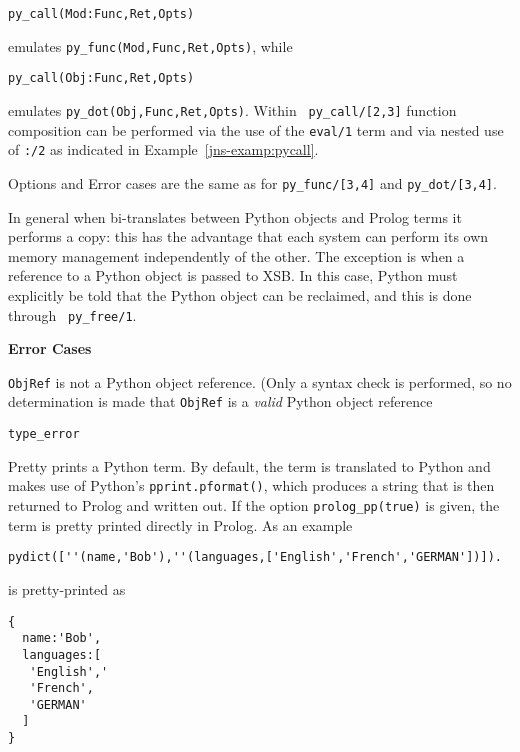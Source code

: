 \begin{description}
{\tt py\_call(Mod:Func,Ret,Opts)}

\noindent
emulates {\tt py\_func(Mod,Func,Ret,Opts)}, while

{\tt py\_call(Obj:Func,Ret,Opts)}

\noindent
emulates {\tt py\_dot(Obj,Func,Ret,Opts)}.  Within {\tt
  py\_call/[2,3]} function composition can be performed via the use of
the {\tt eval/1} term and via nested use of {\tt :/2} as indicated in
Example~\ref{jns-examp:pycall}.

Options and Error cases
are the same as for {\tt py\_func/[3,4]} and {\tt py\_dot/[3,4]}.

%
  In general when \janus{} bi-translates between Python objects and
  Prolog terms it performs a copy: this has the advantage that each
  system can perform its own memory management independently of the
  other.  The exception is when a reference to a Python object is
  passed to XSB.  In this case, Python must explicitly be told that
  the Python object can be reclaimed, and this is done through {\tt
    py\_free/1}.

  {\bf Error Cases}

  \bi
\item {\tt ObjRef} is not a Python object reference.  (Only a syntax
  check is performed, so no determination is made that {\tt ObjRef} is
  a {\em valid} Python object reference
  \bi
  \item {\tt type\_error}
  \ei
  \ei
  
%
Pretty prints a \janus{} Python term.  By
default, the term is translated to Python and makes use of Python's
{\tt pprint.pformat()}, which produces a string that is then returned
to Prolog and written out.  If the option {\tt prolog\_pp(true)} is
given, the term is pretty printed directly in Prolog.  As an example

\begin{verbatim}
pydict([''(name,'Bob'),''(languages,['English','French','GERMAN'])]).
\end{verbatim}

\noindent
is pretty-printed as 
\begin{verbatim}
{
  name:'Bob',
  languages:[
   'English','
   'French',
   'GERMAN'
  ]
} 
\end{verbatim}


\end{description}
